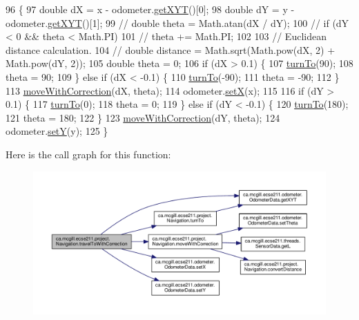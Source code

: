 \begin{DoxyCode}
96                                                                   \{
97     \textcolor{keywordtype}{double} dX = x - odometer.\hyperlink{classca_1_1mcgill_1_1ecse211_1_1odometer_1_1_odometer_data_a8f40f0264c68f0cbed4fff1723ae7863}{getXYT}()[0];
98     \textcolor{keywordtype}{double} dY = y - odometer.\hyperlink{classca_1_1mcgill_1_1ecse211_1_1odometer_1_1_odometer_data_a8f40f0264c68f0cbed4fff1723ae7863}{getXYT}()[1];
99     \textcolor{comment}{// double theta = Math.atan(dX / dY);}
100     \textcolor{comment}{// if (dY < 0 && theta < Math.PI)}
101     \textcolor{comment}{// theta += Math.PI;}
102 
103     \textcolor{comment}{// Euclidean distance calculation.}
104     \textcolor{comment}{// double distance = Math.sqrt(Math.pow(dX, 2) + Math.pow(dY, 2));}
105     \textcolor{keywordtype}{double} theta = 0;
106     \textcolor{keywordflow}{if} (dX > 0.1) \{
107       \hyperlink{classca_1_1mcgill_1_1ecse211_1_1project_1_1_navigation_a3bbe0645f2b3b3d0986b4a707fb5a00c}{turnTo}(90);
108       theta = 90;
109     \} \textcolor{keywordflow}{else} \textcolor{keywordflow}{if} (dX < -0.1) \{
110       \hyperlink{classca_1_1mcgill_1_1ecse211_1_1project_1_1_navigation_a3bbe0645f2b3b3d0986b4a707fb5a00c}{turnTo}(-90);
111       theta = -90;
112     \}
113     \hyperlink{classca_1_1mcgill_1_1ecse211_1_1project_1_1_navigation_a48eeb9ae2da23664421e8da5642054c7}{moveWithCorrection}(dX, theta);
114     odometer.\hyperlink{classca_1_1mcgill_1_1ecse211_1_1odometer_1_1_odometer_data_a2911d7215e47f3064defe016b46bfeef}{setX}(x);
115     
116     \textcolor{keywordflow}{if} (dY > 0.1) \{
117       \hyperlink{classca_1_1mcgill_1_1ecse211_1_1project_1_1_navigation_a3bbe0645f2b3b3d0986b4a707fb5a00c}{turnTo}(0);
118       theta = 0;
119     \} \textcolor{keywordflow}{else} \textcolor{keywordflow}{if} (dY < -0.1) \{
120       \hyperlink{classca_1_1mcgill_1_1ecse211_1_1project_1_1_navigation_a3bbe0645f2b3b3d0986b4a707fb5a00c}{turnTo}(180);
121       theta = 180;
122     \}
123     \hyperlink{classca_1_1mcgill_1_1ecse211_1_1project_1_1_navigation_a48eeb9ae2da23664421e8da5642054c7}{moveWithCorrection}(dY, theta);
124     odometer.\hyperlink{classca_1_1mcgill_1_1ecse211_1_1odometer_1_1_odometer_data_a82986438cd462e66520bc62bb4bd2b75}{setY}(y);
125   \}
\end{DoxyCode}
Here is the call graph for this function\+:
\nopagebreak
\begin{figure}[H]
\begin{center}
\leavevmode
\includegraphics[width=350pt]{classca_1_1mcgill_1_1ecse211_1_1project_1_1_navigation_ae7230e905494002087416294f12cae6a_cgraph}
\end{center}
\end{figure}
